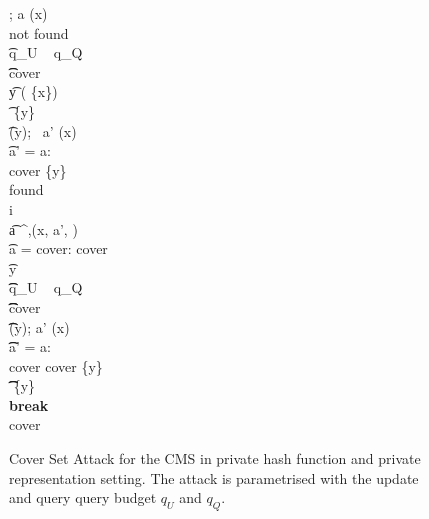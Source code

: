 \begin{figure*}[h]
\begin{pchstack}[boxed,center,space=0.5em]
{				 \gets \emptyset; a \gets \QRYO(x) \\
				\hspace{-.5em}
				\pcwhile \textrm{not found} \\
				\t \pcif q_U \ \UPO {} q_Q \ \QRYO{}\\
				\t \t \pcreturn \textrm{cover} \\
				\t y \getsr \univ \setminus ( \cup \{x\})\\
				\t \streamvar{I} \gets {} \cup \{y\}\\
				\t \UPO(y); \ a' \gets \QRYO(x)\\
				\t \pcif a' \not= a: \\
				\t \t \textrm{cover} \gets \{y\}\\
				\t \t \textrm{found} \gets {}\\
				\pcfor i \in [2, 3, \dots, k]\label{alg:CMS:CK:change}\\
				\t a \gets {}^{\UPO,\QRYO}(x, a', ) \\
				\t \pcif a = \textrm{cover}: \pcreturn \textrm{cover}\\
				\t \pcfor y \in {} \ \\
				\t \t \pcif q_U \ \UPO {} q_Q \ \QRYO{}\\
				\t \t \t \pcreturn \textrm{cover}\\
				\t \t \UPO(y); a' \gets \QRYO(x) \\
				\t \t \pcif a' \not= a: \\
				\t \t \t \textrm{cover} \gets \textrm{cover} \cup \{y\}\\
				\t \t \t {} \gets {} \setminus \{y\}\\
				\t \t \t \textbf{break}\\
				\pcreturn \textrm{cover}
			}
		\end{pchstack}
	\caption[Private Hash and Private Representation CMS Attack.]{Cover Set Attack for the CMS in private
		hash function and private representation setting. 
		The attack is parametrised with  the update and query query budget $q_U$ and $q_Q$.
	}
	\label{fig:attack-cms-iqcsa}
\end{figure*}


